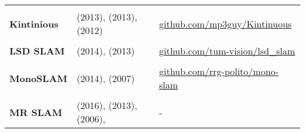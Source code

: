 \documentclass[a4paper,12pt]{scrartcl}
\begin{document}
{\begin{longtable}{l|l|l}
                                                                                                                                  &                                                                                            &   \\ [-3mm]
    \textbf{Kintinious}                                                                                                           & \cite{Whelan2013a} (2013), \cite{Whelan2013} (2013), \cite{Whelan2012} (2012)
                                                                                                                                  & {\href{https://github.com/mp3guy/Kintinuous}{github.com/mp3guy/Kintinuous}}               \\
                                                                                                                                  &                                                                                            &   \\ [-3mm]
    \textbf{LSD SLAM}                                                                                                             & \cite{Engel2014} (2014), \cite{Engel2013} (2013)
                                                                                                                                  & {\href{https://github.com/tum-vision/lsd_slam}{github.com/tum-vision/lsd\_slam}}          \\
                                                                                                                                  &                                                                                            &   \\ [-3mm]
    \textbf{MonoSLAM}                                                                                                             & \cite{Russo2014} (2014), \cite{Davison2007} (2007)
                                                                                                                                  & {\href{https://github.com/rrg-polito/mono-slam}{github.com/rrg-polito/mono-slam}}         \\
                                                                                                                                  &                                                                                            &   \\ [-3mm]
    \textbf{MR SLAM}                                                                                                              & \cite{Choudhary2016} (2016), \cite{Alexandre2013} (2013), \cite{Zhou2006} (2006),          & - \\

\end{longtable}}
\end{document}
